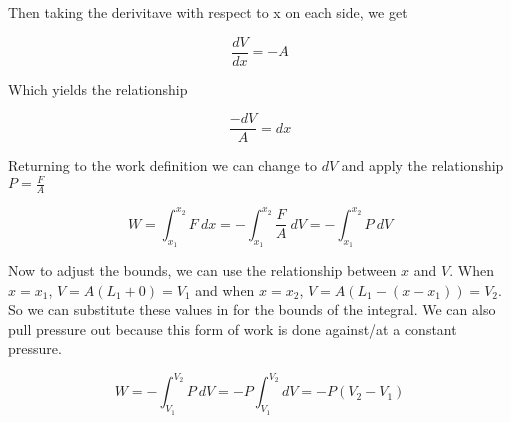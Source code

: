 \documentclass{article}
\begin{document}
Then taking the derivitave with respect to x on each side, we get

$$
  \frac{dV}{dx} = -A
$$

Which yields the relationship

$$
  \frac{- dV}{A} = dx
$$

Returning to the work definition we can change to $dV$ and apply the relationship $P = \frac{F}{A}$

$$
  W = \int_{x_1}^{x_2} F \ dx = - \int_{x_1}^{x_2} \frac{F}{A} \ dV = - \int_{x_1}^{x_2} P \ dV
$$

Now to adjust the bounds, we can use the relationship between $x$ and $V$. When $x = x_1$, $V = A(L_1 + 0) = V_1$ and when $x = x_2$, $V = A(L_1 - (x-x_1)) = V_2$. So we can substitute these values in for the bounds of the integral. We can also pull pressure out because this form of work is done against/at a constant pressure.

$$
  W = - \int_{V_1}^{V_2} P \ dV = - P \int_{V_1}^{V_2} dV = - P(V_2 - V_1)
$$
\end{document}
